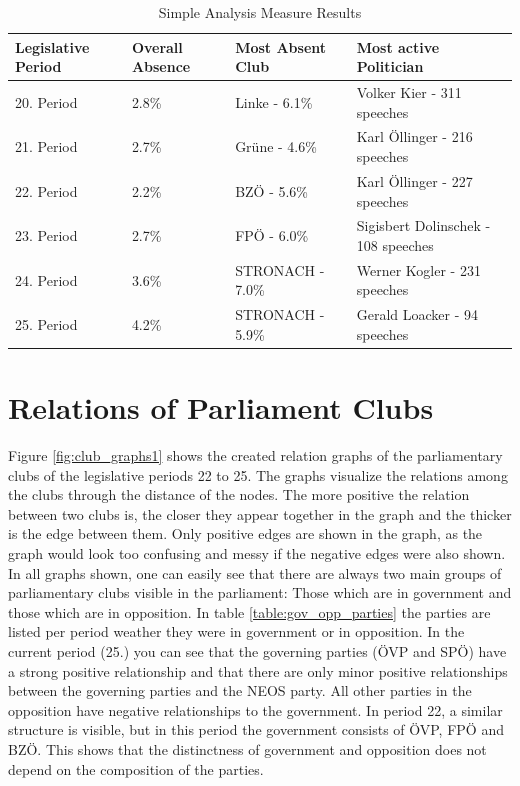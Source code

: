 \begin{table}

\centering
\bgroup
\def\arraystretch{1.2}
\begin{tabular}{| p{2cm} | p{2cm} | p{3.5cm} | p{4cm} |}
\hline
  Legislative Period & Overall Absence & Most Absent Club & Most active Politician  \\
\hline
\hline
  20. Period & 2.8\% & Linke - 6.1\% & Volker Kier - 311 speeches \\
\hline
  21. Period & 2.7\% & Grüne - 4.6\% & Karl Öllinger - 216 speeches \\
\hline
  22. Period & 2.2\% & BZÖ - 5.6\% & Karl Öllinger - 227 speeches \\
\hline
  23. Period & 2.7\% & FPÖ - 6.0\% & Sigisbert Dolinschek - 108 speeches \\
\hline
  24. Period & 3.6\% & STRONACH - 7.0\% & Werner Kogler - 231 speeches \\
\hline
  25. Period & 4.2\% & STRONACH - 5.9\% & Gerald Loacker - 94 speeches \\
\hline

\end{tabular}
\egroup

\caption{Simple Analysis Measure Results}
\label{tab:simple_analysis_results}
\end{table}

\section{Relations of Parliament Clubs}
\label{sec:relations_clubs}
Figure \ref{fig:club_graphs1} shows the created relation graphs of the parliamentary clubs of the legislative periods 22 to 25. The graphs visualize the relations among the clubs through the distance of the nodes. The more positive the relation between two clubs is, the closer they appear together in the graph and the thicker is the edge between them. Only positive edges are shown in the graph, as the graph would look too confusing and messy if the negative edges were also shown. In all graphs shown, one can easily see that there are always two main groups of parliamentary clubs visible in the parliament: Those which are in government and those which are in opposition. In table \ref{table:gov_opp_parties} the parties are listed per period weather they were in government or in opposition. 
In the current period (25.) you can see that the governing parties (ÖVP and SPÖ) have a strong positive relationship and that there are only minor positive relationships between the governing parties and the NEOS party. All other parties in the opposition have negative relationships to the government. In period 22, a similar structure is visible, but in this period the government consists of ÖVP, FPÖ and BZÖ. This shows that the distinctness of government and opposition does not depend on the composition of the parties. 

